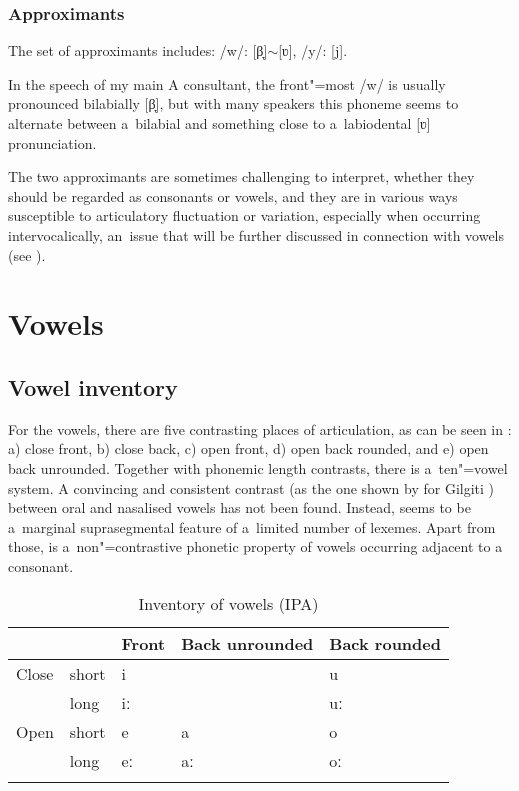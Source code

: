 \subsubsection*{Approximants}

The set of approximants includes: /w/: [β̞]$\sim$[ʋ], /y/: [j].


In the speech of my main A consultant, the front"=most  /w/ is usually pronounced bilabially [β̞], but with many speakers this phoneme seems to alternate between a~bilabial and something close to a~labiodental [ʋ] pronunciation.


The two approximants are sometimes challenging to interpret, whether they should be regarded as consonants or vowels, and they are in various ways susceptible to articulatory fluctuation or variation, especially when occurring intervocalically, an~issue that will be further discussed in connection with vowels (see ).


\section{Vowels}
\label{sec:3-2}

\subsection{Vowel inventory}

For the vowels, there are five contrasting places of articulation, as can be seen in : a) close front, b) close back, c) open front, d) open back rounded, and e) open back unrounded. Together with phonemic length contrasts, there is a~ten"=vowel system. A convincing and consistent contrast (as the one shown by \citet[19]{radloff1999} for Gilgiti \iliShina) between oral and nasalised vowels has not been found. Instead,  seems to be a~marginal suprasegmental feature of a~limited number of lexemes. Apart from those,  is a~non"=contrastive phonetic property of vowels occurring adjacent to a~ consonant. 



\begin{table}[ht]
\caption{Inventory of vowels (IPA)}
\begin{tabularx}{\textwidth}{ Q Q Q Q Q }
\lsptoprule
&
&
Front
&
Back unrounded &
Back rounded \\\midrule
Close &
short &
i &
&
u\\
&
long &
iː &
&
uː\\
Open &
short &
e &
a &
o\\
&
long &
eː &
aː &
oː\\\lspbottomrule
\end{tabularx}
\label{tab:3-3}
\end{table}

